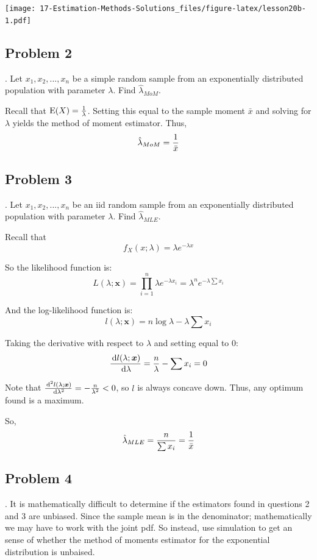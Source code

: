 \documentclass[
]{book}
\begin{document}
\texttt{[image: 17-Estimation-Methods-Solutions\_files/figure-latex/lesson20b-1.pdf]}

\hypertarget{problem-2-16}{%
\subsection{Problem 2}\label{problem-2-16}}

. Let \(x_1,x_2,...,x_n\) be a simple random sample from an exponentially distributed population with parameter \(\lambda\). Find \(\hat{\lambda}_{MoM}\).

Recall that \(\mbox{E}(X)={1\over \lambda}\). Setting this equal to the sample moment \(\bar{x}\) and solving for \(\lambda\) yields the method of moment estimator. Thus,
\[
\hat{\lambda}_{MoM}={1\over \bar{x}}
\]

\hypertarget{problem-3-12}{%
\subsection{Problem 3}\label{problem-3-12}}

. Let \(x_1,x_2,...,x_n\) be an iid random sample from an exponentially distributed population with parameter \(\lambda\). Find \(\hat{\lambda}_{MLE}\).

Recall that
\[
f_X(x;\lambda)=\lambda e^{-\lambda x}
\]

So the likelihood function is:
\[
L(\lambda;\boldsymbol{x})=\prod_{i=1}^n \lambda e^{-\lambda x_i}=\lambda^n e^{-\lambda\sum x_i}
\]

And the log-likelihood function is:
\[
l(\lambda;\boldsymbol{x})=n\log \lambda - \lambda \sum x_i
\]

Taking the derivative with respect to \(\lambda\) and setting equal to 0:
\[
{\,\mathrm{d}l(\lambda;\boldsymbol{x})\over \,\mathrm{d}\lambda}={n\over \lambda}-\sum x_i =0
\]

Note that \({\,\mathrm{d}^2 l(\lambda;\boldsymbol{x})\over\,\mathrm{d}\lambda^2}=-{n\over \lambda^2}<0\), so \(l\) is always concave down. Thus, any optimum found is a maximum.

So,
\[
\hat{\lambda}_{MLE}={n\over \sum x_i}={1\over \bar{x}}
\]

\hypertarget{problem-4-8}{%
\subsection{Problem 4}\label{problem-4-8}}

. It is mathematically difficult to determine if the estimators found in questions 2 and 3 are unbiased. Since the sample mean is in the denominator; mathematically we may have to work with the joint pdf. So instead, use simulation to get an sense of whether the method of moments estimator for the exponential distribution is unbaised.
\end{document}

